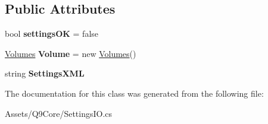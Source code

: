 \subsection*{Public Attributes}
\begin{DoxyCompactItemize}
\item 
\mbox{\label{class_q9_core_1_1_settings_i_o_ab6964f3c53885919eeb981c4ebcb97b0}} 
bool {\bfseries settings\+OK} = false
\item 
\mbox{\label{class_q9_core_1_1_settings_i_o_ab0347073a5905888ab87dcfaf1647713}} 
\mbox{\hyperlink{class_q9_core_1_1_settings_i_o_1_1_volumes}{Volumes}} {\bfseries Volume} = new \mbox{\hyperlink{class_q9_core_1_1_settings_i_o_1_1_volumes}{Volumes}}()
\item 
\mbox{\label{class_q9_core_1_1_settings_i_o_a214bb0b97d1b6977eb93a4b8b769a94f}} 
string {\bfseries Settings\+X\+ML}
\end{DoxyCompactItemize}


The documentation for this class was generated from the following file\+:\begin{DoxyCompactItemize}
\item 
Assets/\+Q9\+Core/Settings\+I\+O.\+cs\end{DoxyCompactItemize}
